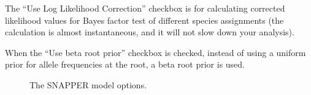 {    The ``Use Log Likelihood Correction'' checkbox is for calculating corrected likelihood values for Bayes factor test of different species assignments (the calculation is almost instantaneous, and it will not slow down your analysis).
    
    When the ``Use beta root prior'' checkbox is checked, instead of using a uniform prior for allele frequencies at the root, a beta root prior is used.
 
    
        \begin{figure}[htbp]
        \centering
        \caption{The SNAPPER model options.}
        \label{fig:beauti-mutation}
    \end{figure}
}

